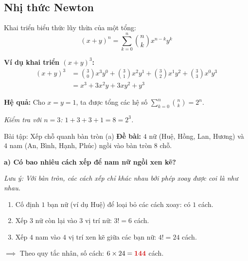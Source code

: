 \documentclass[12pt,a4paper]{article}
\begin{document}
\subsection{Nhị thức Newton}

Khai triển biểu thức lũy thừa của một tổng:
\[
  (x + y)^n = \sum_{k=0}^{n} \binom{n}{k} x^{n-k} y^k
\]

\textbf{Ví dụ khai triển $(x + y)^3$:}
\begin{align*}
  (x + y)^3 &= \binom{3}{0} x^3 y^0 + \binom{3}{1} x^2 y^1 + \binom{3}{2} x^1 y^2 + \binom{3}{3} x^0 y^3 \\
            &= x^3 + 3x^2 y + 3xy^2 + y^3
\end{align*}

\textbf{Hệ quả:} Cho $x = y = 1$, ta được tổng các hệ số $\sum_{k=0}^{n} \binom{n}{k} = 2^n$.

\textit{Kiểm tra với $n = 3$: $1 + 3 + 3 + 1 = 8 = 2^3$.}

\begin{baitap}{Bài tập: Xếp chỗ quanh bàn tròn (a)}
\textbf{Đề bài:} $4$ nữ (Huệ, Hồng, Lan, Hương) và $4$ nam (An, Bình, Hạnh, Phúc) ngồi vào bàn tròn $8$ chỗ.

\noindent
\begin{minipage}[t]{0.60\textwidth}
\textbf{a) Có bao nhiêu cách xếp để nam nữ ngồi xen kẽ?}

\textit{Lưu ý: Với bàn tròn, các cách xếp chỉ khác nhau bởi phép xoay được coi là như nhau.}
\begin{enumerate}
  \item Cố định $1$ bạn nữ (ví dụ Huệ) để loại bỏ các cách xoay: có $1$ cách.
  \item Xếp $3$ nữ còn lại vào $3$ vị trí nữ: $3! = 6$ cách.
  \item Xếp $4$ nam vào $4$ vị trí xen kẽ giữa các bạn nữ: $4! = 24$ cách.
\end{enumerate}
$\implies$ Theo quy tắc nhân, số cách: $6 \times 24 = \textcolor{AccentRed}{\mathbf{144}}$ cách.
\end{minipage}
\hfill
\begin{minipage}[t]{0.36\textwidth}
\centering
\vspace{0pt}
\end{minipage}
\end{baitap}
\end{document}
